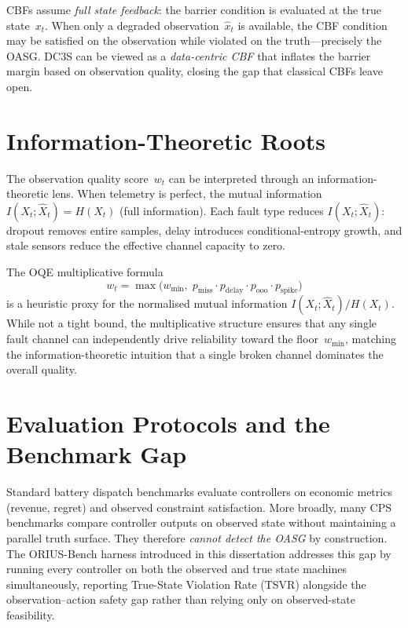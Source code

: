 CBFs assume \emph{full state feedback}: the barrier condition is evaluated
at the true state~$x_t$.  When only a degraded observation~$\hat{x}_t$ is
available, the CBF condition may be satisfied on the observation while
violated on the truth---precisely the OASG.  DC3S can be viewed as a
\emph{data-centric CBF} that inflates the barrier margin based on
observation quality, closing the gap that classical CBFs leave open.

\section{Information-Theoretic Roots}

The observation quality score~$w_t$ can be interpreted through an
information-theoretic lens.  When telemetry is perfect, the mutual
information $I(X_t; \hat{X}_t) = H(X_t)$ (full information).  Each fault
type reduces $I(X_t; \hat{X}_t)$: dropout removes entire samples, delay
introduces conditional-entropy growth, and stale sensors reduce the
effective channel capacity to zero.

The OQE multiplicative formula
\[
  w_t = \max\!\bigl(w_{\min},\;
  p_{\mathrm{miss}} \cdot p_{\mathrm{delay}} \cdot p_{\mathrm{ooo}} \cdot p_{\mathrm{spike}}\bigr)
\]
is a heuristic proxy for the normalised mutual information
$I(X_t; \hat{X}_t) / H(X_t)$.  While not a tight bound, the
multiplicative structure ensures that any single fault channel can
independently drive reliability toward the floor~$w_{\min}$, matching
the information-theoretic intuition that a single broken channel
dominates the overall quality.

\section{Evaluation Protocols and the Benchmark Gap}

Standard battery dispatch benchmarks evaluate controllers on economic
metrics (revenue, regret) and observed constraint satisfaction.  More
broadly, many CPS benchmarks compare controller outputs on observed state
without maintaining a parallel truth surface.  They therefore \emph{cannot
detect the OASG} by construction.  The ORIUS-Bench harness introduced in
this dissertation addresses this gap by running every controller on both the
observed and true state machines simultaneously, reporting True-State
Violation Rate (TSVR) alongside the observation--action safety gap rather
than relying only on observed-state feasibility.

